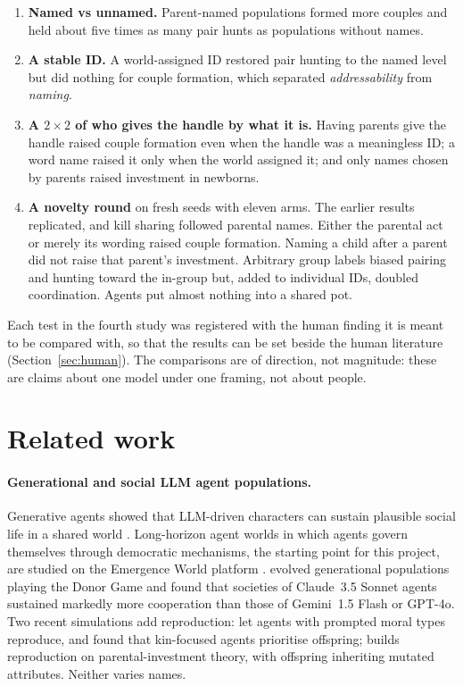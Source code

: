 \documentclass[11pt]{article}
\begin{document}
\begin{enumerate}
  \item \textbf{Named vs unnamed.} Parent-named populations formed more couples and held about
        five times as many pair hunts as populations without names.
  \item \textbf{A stable ID.} A world-assigned ID restored pair hunting to the named level but
        did nothing for couple formation, which separated \emph{addressability} from
        \emph{naming}.
  \item \textbf{A $2\times2$ of who gives the handle by what it is.} Having parents give the
        handle raised couple formation even when the handle was a meaningless ID; a word name
        raised it only when the world assigned it; and only names chosen by parents raised
        investment in newborns.
  \item \textbf{A novelty round} on fresh seeds with eleven arms. The earlier results replicated,
        and kill sharing followed parental names. Either the parental act or merely its wording
        raised couple formation. Naming a child after a parent did not raise that parent's
        investment. Arbitrary group labels biased pairing and hunting toward the in-group but,
        added to individual IDs, doubled coordination. Agents put almost nothing into a shared
        pot.
\end{enumerate}

Each test in the fourth study was registered with the human finding it is meant to be compared
with, so that the results can be set beside the human literature (Section~\ref{sec:human}).
The comparisons are of direction, not magnitude: these are claims about one model under one
framing, not about people.

\section{Related work}
\label{sec:related}

\paragraph{Generational and social LLM agent populations.}
Generative agents showed that LLM-driven characters can sustain plausible social life in a shared
world \citep{park2023generative}. Long-horizon agent worlds in which agents govern themselves
through democratic mechanisms, the starting point for this project, are studied on the Emergence
World platform \citep{akkil2026emergence,akkil2026stress}. \citet{vallinder2024cultural} evolved
generational populations playing the Donor Game and found that societies of Claude~3.5 Sonnet
agents sustained markedly more cooperation than those of Gemini~1.5 Flash or GPT-4o. Two recent simulations add reproduction: \citet{zhou2026moral} let agents
with prompted moral types reproduce, and found that kin-focused agents prioritise offspring;
\citet{pasichnyk2026yerkes} builds reproduction on parental-investment theory, with offspring
inheriting mutated attributes. Neither varies names.
\end{document}
